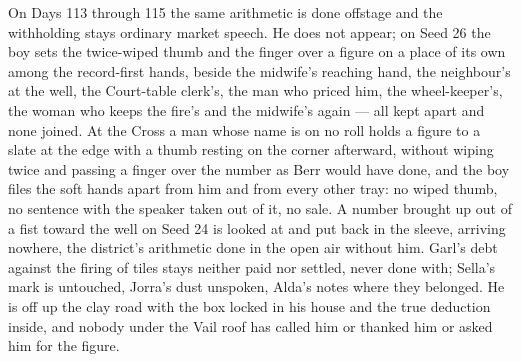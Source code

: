 \documentclass{design/chronicle}
\begin{document}
{On Days 113 through 115 the same arithmetic is done offstage and the withholding stays ordinary market speech. He does not appear; on Seed 26 the boy sets the twice-wiped thumb and the finger over a figure on a place of its own among the record-first hands, beside the midwife’s reaching hand, the neighbour’s at the well, the Court-table clerk’s, the man who priced him, the wheel-keeper’s, the woman who keeps the fire’s and the midwife’s again — all kept apart and none joined. At the Cross a man whose name is on no roll holds a figure to a slate at the edge with a thumb resting on the corner afterward, without wiping twice and passing a finger over the number as Berr would have done, and the boy files the soft hands apart from him and from every other tray: no wiped thumb, no sentence with the speaker taken out of it, no sale. A number brought up out of a fist toward the well on Seed 24 is looked at and put back in the sleeve, arriving nowhere, the district’s arithmetic done in the open air without him. Garl’s debt against the firing of tiles stays neither paid nor settled, never done with; Sella’s mark is untouched, Jorra’s dust unspoken, Alda’s notes where they belonged. He is off up the clay road with the box locked in his house and the true deduction inside, and nobody under the Vail roof has called him or thanked him or asked him for the figure.

}
\end{document}
